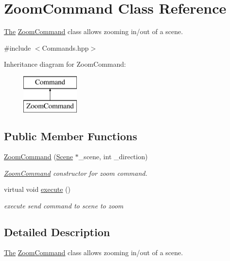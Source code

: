 \hypertarget{class_zoom_command}{}\section{Zoom\+Command Class Reference}
\label{class_zoom_command}


\hyperlink{namespace_the}{The} \hyperlink{class_zoom_command}{Zoom\+Command} class allows zooming in/out of a scene.  




{\ttfamily \#include $<$Commands.\+hpp$>$}

Inheritance diagram for Zoom\+Command\+:\begin{figure}[H]
\begin{center}
\leavevmode
\includegraphics[height=2.000000cm]{class_zoom_command}
\end{center}
\end{figure}
\subsection*{Public Member Functions}
\begin{DoxyCompactItemize}
\item 
\hyperlink{class_zoom_command_afcaebae62b91546a369c98e7fd3d2cc3}{Zoom\+Command} (\hyperlink{class_scene}{Scene} $\ast$\+\_\+scene, int \+\_\+direction)
\begin{DoxyCompactList}\small\item\em \hyperlink{class_zoom_command}{Zoom\+Command} constructor for zoom command. \end{DoxyCompactList}\item 
\hypertarget{class_zoom_command_abf437430c2ff047efe463622efd609c3}{}virtual void \hyperlink{class_zoom_command_abf437430c2ff047efe463622efd609c3}{execute} ()\label{class_zoom_command_abf437430c2ff047efe463622efd609c3}

\begin{DoxyCompactList}\small\item\em execute send command to scene to zoom \end{DoxyCompactList}\end{DoxyCompactItemize}


\subsection{Detailed Description}
\hyperlink{namespace_the}{The} \hyperlink{class_zoom_command}{Zoom\+Command} class allows zooming in/out of a scene. 


